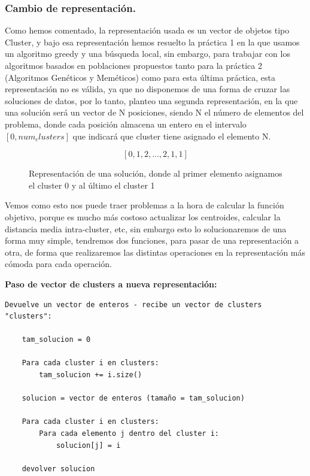 \documentclass[12pt, spanish]{article}
\begin{document}
\subsubsection{Cambio de representación.}

Como hemos comentado, la representación usada es un vector de objetos tipo Cluster, y bajo esa representación hemos resuelto la práctica 1 en la que usamos un algoritmo greedy y una búsqueda local, sin embargo, para trabajar con los algoritmos basados en poblaciones propuestos tanto para la práctica 2 (Algoritmos Genéticos y Meméticos) como para esta última práctica, esta representación no es válida, ya que no disponemos de una forma de cruzar las soluciones de datos, por lo tanto, planteo una segunda representación, en la que una solución será un vector de N posiciones, siendo N el número de elementos del problema, donde cada posición almacena un entero en el intervalo $[0, num_clusters]$ que indicará que cluster tiene asignado el elemento N.


\begin{figure}[H]
  \centering
      $$[0, 1, 2, ... , 2, 1, 1]$$
 		 \caption{Representación de una solución, donde al primer elemento asignamos el cluster 0 y al último el cluster 1}
  		\label{fig:ej_nueva_sol}
\end{figure}

Vemos como esto nos puede traer problemas a la hora de calcular la función objetivo, porque es mucho más costoso actualizar los centroides, calcular la distancia media intra-cluster, etc, sin embargo esto lo solucionaremos de una forma muy simple, tendremos dos funciones, para pasar de una representación a otra, de forma que realizaremos las distintas operaciones en la representación más cómoda para cada operación.

\newpage

\textbf{Paso de vector de clusters a nueva representación:}

\begin{lstlisting}
Devuelve un vector de enteros - recibe un vector de clusters "clusters":

	tam_solucion = 0

	Para cada cluster i en clusters:
		tam_solucion += i.size()

	solucion = vector de enteros (tamaño = tam_solucion)

	Para cada cluster i en clusters:
		Para cada elemento j dentro del cluster i:
			solucion[j] = i

	devolver solucion
\end{lstlisting}
\end{document}
